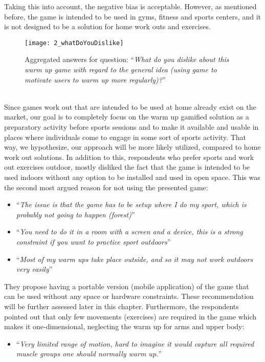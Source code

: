 Taking this into account, the negative bias is acceptable. However, as mentioned before, the game is intended to be used in gyms, fitness and sports centers, and it is not designed to be a solution for home work outs and exercises.
\begin{figure}[h]
    \centering
    \texttt{[image: 2\_whatDoYouDislike]}
    \caption{Aggregated answers for question: ``\textit{What do you dislike about this warm up game with regard to the general idea (using game to motivate users to warm up more regularly)?}''}
    \label{fig:2_whatDoYouDislike}
\end{figure}\\
Since games  work out that are intended to be used at home already exist on the market, our goal is to completely focus on the warm up gamified solution as a preparatory activity before sports sessions and to make it available and usable in places where individuals come to engage in some sort of sports activity. That way, we hypothesize, our approach will be more likely utilized, compared to home work out solutions. In addition to this, respondents who prefer sports and work out exercises outdoor, mostly disliked the fact that the game is intended to be used indoors without any option to be installed and used in open space. This was the second most argued reason for not using the presented game:
\begin{itemize}
\item ``\textit{The issue is that the game has to be setup where I do my sport, which is probably not going to happen (forest)}''
\item ``\textit{You need to do it in a room with a screen and a device, this is a strong constraint if you want to practice sport outdoors}''
\item ``\textit{Most of my warm ups take place outside, and so it may not work outdoors very easily}''
\end{itemize}
They propose having a portable version (mobile application) of the game that can be used without any space or hardware constraints. These recommendation will be further assessed later in this chapter. Furthermore, the respondents pointed out that only few movements (exercises) are required in the game which makes it one-dimensional, neglecting the warm up for arms and upper body:
\begin{itemize}
\item ``\textit{Very limited range of motion, hard to imagine it would capture all required muscle groups one should normally warm up.}''
\end{itemize}
